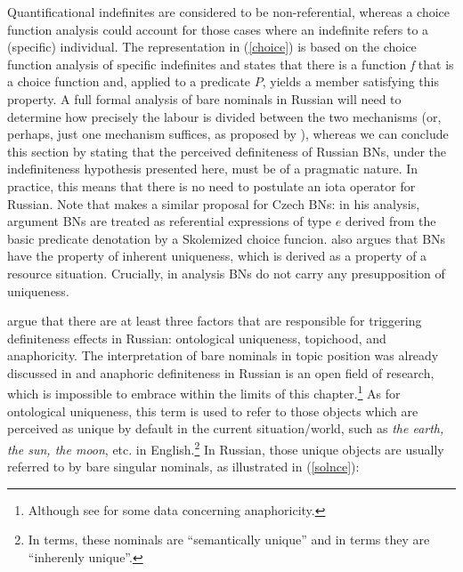 \documentclass[output=paper,colorlinks,citecolor=brown]{langscibook}
\begin{document}
\noindent Quantificational indefinites are considered to be non-referential, whereas a choice function analysis could account for those cases where an indefinite refers to a (specific) individual. The representation in (\ref{choice}) is based on the choice function analysis of specific indefinites \citep[cf.][]{Reinhart1997, Winter1997, kratzer98a} and states that there is a function \textit{f} that is a choice function and, applied to a predicate $P$, yields a member satisfying this property. A full formal analysis of bare nominals in Russian will need to determine how precisely the labour is divided between the two mechanisms (or, perhaps, just one mechanism suffices, as proposed by \citealt{Winter1997}), whereas we can conclude this section by stating that the perceived definiteness of Russian BNs, under the indefiniteness hypothesis presented here, must be of a pragmatic nature. In practice, this means that there is no need to postulate an iota operator for Russian. Note that \citet{Simik2021} makes a similar proposal for Czech BNs: in his analysis, argument BNs are treated as referential expressions of type $e$ derived from the basic predicate denotation by a Skolemized choice funcion. \citet{Simik2021} also argues that BNs have the property of inherent uniqueness, which is derived as a property of a resource situation. Crucially, in  analysis BNs do not carry any presupposition of uniqueness. 

\citet{seresborik21} argue that there are at least three factors that are responsible for triggering definiteness effects in Russian: ontological uniqueness, topichood, and anaphoricity. The interpretation of bare nominals in topic position was already discussed in  and anaphoric definiteness in Russian is an open field of research, which is impossible to embrace within the limits of this chapter.\footnote{Although see \citet{Borik.etal2020, seresetal} for some data concerning anaphoricity.} As for ontological uniqueness, this term is used to refer to those objects which are perceived as unique by default in the current situation/world, such as \textit{the earth, the sun, the moon}, etc. in English.\footnote{In  terms, these nominals are ``semantically unique'' and in  terms they are ``inherenly unique''.} In Russian, those unique objects are usually referred to by bare singular nominals, as illustrated in (\ref{solnce}):
\end{document}
